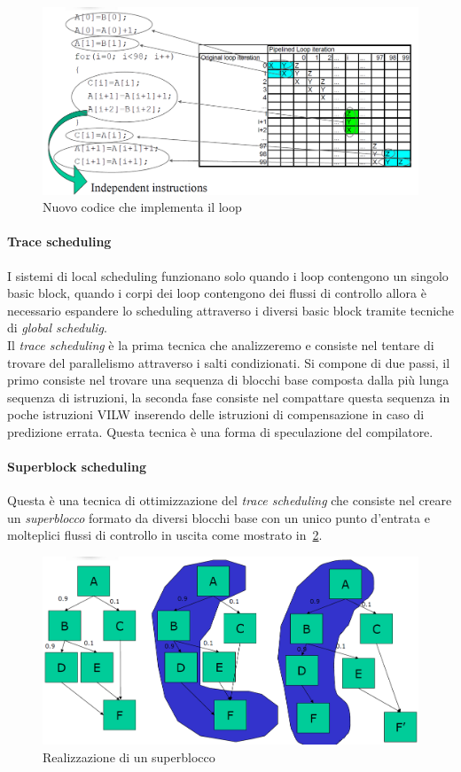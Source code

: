 \begin{figure}[htb]
\centering
\includegraphics[scale=0.4]{img/newcicle.png}
\caption{Nuovo codice che implementa il loop}\label{fig:newcicle}
\end{figure}
\paragraph{Trace scheduling}
I sistemi di local scheduling funzionano solo quando i loop contengono un singolo basic block, quando i corpi dei loop contengono dei flussi di controllo allora è necessario espandere lo scheduling attraverso i diversi basic block tramite tecniche di \emph{global schedulig}.\\
Il \emph{trace scheduling} è la prima tecnica che analizzeremo e consiste nel tentare di trovare del parallelismo attraverso i salti condizionati. Si compone di due passi, il primo consiste nel trovare una sequenza di blocchi base composta dalla più lunga sequenza di istruzioni, la seconda fase consiste nel compattare questa sequenza in poche istruzioni VILW inserendo delle istruzioni di compensazione in caso di predizione errata. Questa tecnica è una forma di speculazione del compilatore.
\paragraph{Superblock scheduling}
Questa è una tecnica di ottimizzazione del \emph{trace scheduling} che consiste nel creare un \emph{superblocco} formato da diversi blocchi base con un unico punto d'entrata e molteplici flussi di controllo in uscita come mostrato in \figurename\,\ref{fig:superblock}.
\begin{figure}[htb]
\centering
\includegraphics[scale=0.4]{img/superblock.png}
\caption{Realizzazione di un superblocco}\label{fig:superblock}
\end{figure}

